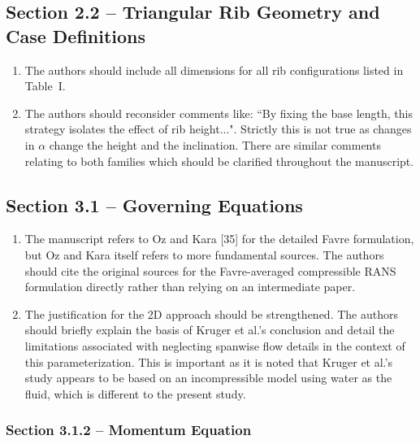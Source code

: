 \documentclass[11pt]{article}
\begin{document}
	\subsection*{Section 2.2 -- Triangular Rib Geometry and Case Definitions}
	
	\begin{enumerate}
		\item The authors should include all dimensions for all rib configurations listed in Table~I.
		\item The authors should reconsider comments like: ``By fixing the base length, this strategy isolates the effect of rib height...". Strictly this is not true as changes in $\alpha$ change the height and the inclination. There are similar comments relating to both families which should be clarified throughout the manuscript.
	\end{enumerate}
	
	\subsection*{Section 3.1 -- Governing Equations}
	
	\begin{enumerate}
		\item The manuscript refers to Oz and Kara [35] for the detailed Favre formulation, but Oz and Kara itself refers to more fundamental sources. The authors should cite the original sources for the Favre-averaged compressible RANS formulation directly rather than relying on an intermediate paper.
		
		\item The justification for the 2D approach should be strengthened. The authors should briefly explain the basis of Kruger et al.'s conclusion and detail the limitations associated with neglecting spanwise flow details in the context of this parameterization. This is important as it is noted that Kruger et al.'s study appears to be based on an incompressible model using water as the fluid, which is different to the present study.
	\end{enumerate}
	
	\subsubsection*{Section 3.1.2 -- Momentum Equation}
	
\end{document}
